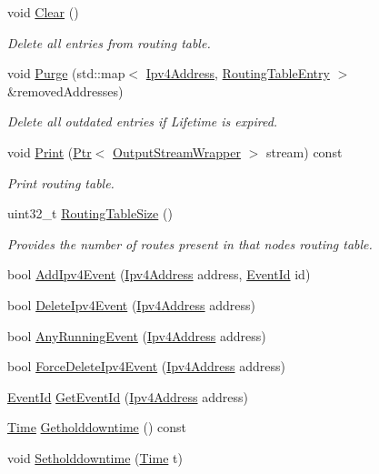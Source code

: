 \begin{DoxyCompactItemize}
void \hyperlink{classns3_1_1dsdv_1_1RoutingTable_a4b082df912185628706b93ddbe1eeefb}{Clear} ()
\begin{DoxyCompactList}\small\item\em Delete all entries from routing table. \end{DoxyCompactList}\item 
void \hyperlink{classns3_1_1dsdv_1_1RoutingTable_ad4e2b213772381511453c5ec8c968e68}{Purge} (std\+::map$<$ \hyperlink{classns3_1_1Ipv4Address}{Ipv4\+Address}, \hyperlink{classns3_1_1dsdv_1_1RoutingTableEntry}{Routing\+Table\+Entry} $>$ \&removed\+Addresses)
\begin{DoxyCompactList}\small\item\em Delete all outdated entries if Lifetime is expired. \end{DoxyCompactList}\item 
void \hyperlink{classns3_1_1dsdv_1_1RoutingTable_a12577457ac58fcc4ab12b44f26955878}{Print} (\hyperlink{classns3_1_1Ptr}{Ptr}$<$ \hyperlink{classns3_1_1OutputStreamWrapper}{Output\+Stream\+Wrapper} $>$ stream) const 
\begin{DoxyCompactList}\small\item\em Print routing table. \end{DoxyCompactList}\item 
uint32\+\_\+t \hyperlink{classns3_1_1dsdv_1_1RoutingTable_aaf031509f86a4a0ab0b0aaa1ba4e51e5}{Routing\+Table\+Size} ()
\begin{DoxyCompactList}\small\item\em Provides the number of routes present in that nodes routing table. \end{DoxyCompactList}\item 
bool \hyperlink{classns3_1_1dsdv_1_1RoutingTable_aa9757950491f7aba7c1db83b2d62df67}{Add\+Ipv4\+Event} (\hyperlink{classns3_1_1Ipv4Address}{Ipv4\+Address} address, \hyperlink{classns3_1_1EventId}{Event\+Id} id)
\item 
bool \hyperlink{classns3_1_1dsdv_1_1RoutingTable_a64caf377cd234d84f77215885d8b1967}{Delete\+Ipv4\+Event} (\hyperlink{classns3_1_1Ipv4Address}{Ipv4\+Address} address)
\item 
bool \hyperlink{classns3_1_1dsdv_1_1RoutingTable_acb9f117332351347f8345d4591991e6b}{Any\+Running\+Event} (\hyperlink{classns3_1_1Ipv4Address}{Ipv4\+Address} address)
\item 
bool \hyperlink{classns3_1_1dsdv_1_1RoutingTable_a39f4b7725caafbc6cd9f7c5821470d51}{Force\+Delete\+Ipv4\+Event} (\hyperlink{classns3_1_1Ipv4Address}{Ipv4\+Address} address)
\item 
\hyperlink{classns3_1_1EventId}{Event\+Id} \hyperlink{classns3_1_1dsdv_1_1RoutingTable_aa7d334052c89ba061285d2a207a12cfe}{Get\+Event\+Id} (\hyperlink{classns3_1_1Ipv4Address}{Ipv4\+Address} address)
\item 
\hyperlink{classns3_1_1Time}{Time} \hyperlink{classns3_1_1dsdv_1_1RoutingTable_ac2d69ac1db33a283028afa7fd5bc9c74}{Getholddowntime} () const 
\item 
void \hyperlink{classns3_1_1dsdv_1_1RoutingTable_a5243e09b9ec6fe4e5fc8f9f362830a46}{Setholddowntime} (\hyperlink{classns3_1_1Time}{Time} t)
\end{DoxyCompactItemize}
